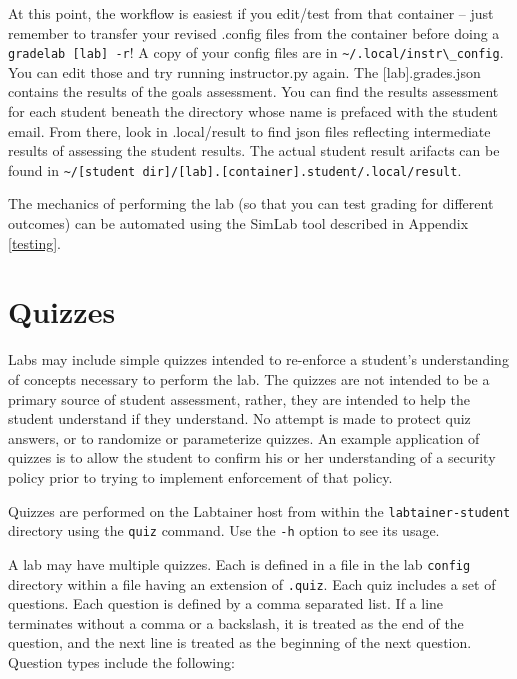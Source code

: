 \documentclass[12pt]{article}
\begin{document}
At this point, the workflow is easiest if you edit/test from that container --
just remember to transfer your revised .config files from the container before
doing a {\tt gradelab [lab] -r}!  A copy of your config files are in \verb!~/.local/instr\_config!.  You can edit
those and try running instructor.py again.  The [lab].grades.json contains the
results of the goals assessment.  You can find the results assessment for each 
student beneath the directory whose name is prefaced with the student email.  
From there, look in .local/result to find json files reflecting intermediate 
results of assessing the student results.  The actual student result arifacts
can be found in \verb!~/[student dir]/[lab].[container].student/.local/result!. 

The mechanics of performing the lab (so that you can test grading for different outcomes)
can be automated using the SimLab tool described in Appendix \ref{testing}.

\section{Quizzes}
Labs may include simple quizzes intended to re-enforce a student's understanding of concepts
necessary to perform the lab.  The quizzes are not intended to be a primary source of
student assessment, rather, they are intended to help the student understand if they understand.
No attempt is made to protect quiz answers, or to randomize or parameterize quizzes.
An example application of quizzes is to allow the student to confirm his or her understanding
of a security policy prior to trying to implement enforcement of that policy.

Quizzes are performed on the Labtainer host from within the {\tt labtainer-student} directory
using the {\tt quiz} command.  Use the {\tt -h} option to see its usage.

A lab may have multiple quizzes.  Each is defined in a file in the lab {\tt config} directory
within a file having an extension of {\tt .quiz}.  Each quiz includes a set of
questions.  Each question is defined by a comma separated list.  If a line terminates 
without a comma or a backslash, it is treated as the end of the question, and the next line
is treated as the beginning of the next question.
Question types include the following:
\end{document}
